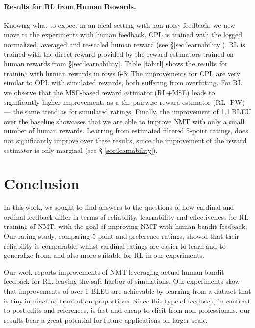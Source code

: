 \paragraph{Results for RL from Human Rewards.} Knowing what to expect in an ideal setting with non-noisy feedback, we now move to the experiments with human feedback. OPL is trained with the logged normalized, averaged and re-scaled human reward (see §\ref{sec:learnability}). RL is trained with the direct reward provided by the reward estimators trained on human rewards from §\ref{sec:learnability}. Table \ref{tab:rl} shows the results for training with human rewards in rows 6-8: The improvements for OPL are very similar to OPL with simulated rewards, both suffering from overfitting. For RL we observe that the MSE-based reward estimator (RL+MSE) leads to significantly higher improvements as a the pairwise reward estimator (RL+PW) --- the same trend as for simulated ratings. Finally, the improvement of 1.1 BLEU over the baseline showcases that we are able to improve NMT with only a small number of human rewards. Learning from estimated filtered 5-point ratings, does not significantly improve over these results, since the improvement of the reward estimator is only marginal (see § \ref{sec:learnability}). 

\section{Conclusion}
\label{sec:disc}

In this work, we sought to find answers to the questions of how cardinal and ordinal feedback differ in terms of reliability, learnability and effectiveness for RL training of NMT, with the goal of improving NMT with human bandit feedback. Our rating study, comparing 5-point and preference ratings, showed that their reliability is comparable, whilst cardinal ratings are easier to learn and to generalize from, and also more suitable for RL in our experiments.

Our work reports improvements of NMT leveraging actual human bandit feedback for RL, leaving the safe harbor of simulations. Our experiments show that improvements of over 1 BLEU are achievable by learning from a dataset that is tiny in machine translation proportions. Since this type of feedback, in contrast to post-edits and references, is fast and cheap to elicit from non-professionals, our results bear a great potential for future applications on larger scale.


